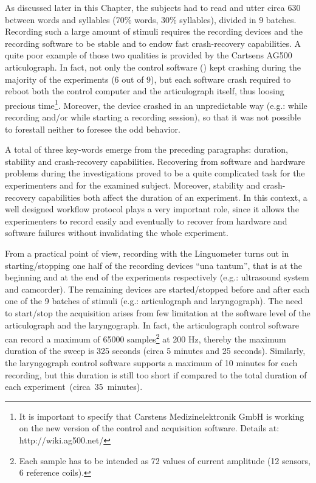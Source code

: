 As discussed later in this Chapter, the subjects had to read and utter circa 630
between words and syllables (70\% words, 30\% syllables), divided in 9 batches.
Recording such a large amount of stimuli requires the recording devices and
the recording software to be stable and to endow fast crash-recovery
capabilities.
A quite poor example of those two qualities is provided by the Cartsens AG500
articulograph. 
In fact, not only the control software () 
kept crashing during the majority of the experiments (6 out of 9), but each 
software crash required to reboot both the control computer and the 
articulograph itself, thus loosing precious time\footnote{It is important to
specify that Carstens Medizinelektronik GmbH is working on the new version of
the control and acquisition software. Details at: http://wiki.ag500.net/}. 
Moreover, the device crashed in an unpredictable
way (e.g.: while recording and/or while starting a recording session), so that
it was not possible to forestall neither to foresee the odd behavior.

A total of three key-words emerge from the preceding paragraphs: 
duration, stability and crash-recovery capabilities.
Recovering from software and hardware problems during the investigations proved
to be a quite complicated task for the experimenters and for the examined
subject.
Moreover, stability and crash-recovery capabilities both affect the duration
of an experiment. 
In this context, a well designed workflow protocol plays a very important role,
since it allows the experimenters to record easily and eventually to recover
from hardware and software failures without invalidating the whole experiment.

From a practical point of view, recording with the Linguometer turns out in
starting/stopping one half of the recording devices ``una tantum'', that is at
the beginning and at the end of the experiments respectively (e.g.: ultrasound 
system and
camcorder).
The remaining devices are started/stopped before and after each one of the 9
batches of stimuli (e.g.: articulograph and laryngograph).
The need to start/stop the acquisition arises from few limitation at the
software level of the articulograph and the laryngograph.
In fact, the articulograph control software can record a maximum of 65000 
samples\footnote{Each sample has to be intended as 72 values of current
amplitude (12 sensors, 6 reference coils).} at 200 Hz, thereby the maximum
duration of the sweep is 325 seconds (circa 5 minutes and 25 seconds).
Similarly, the laryngograph control software supports a maximum of 10 minutes
for each recording, but this duration is still too short if compared to the
total duration of each experiment~(circa~35~minutes).

